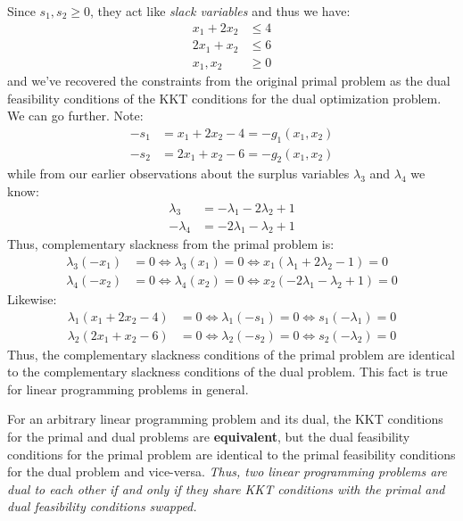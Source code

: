 Since $s_1, s_2 \geq 0$, they act like \textit{slack variables} and thus we have:
\begin{displaymath}
\begin{aligned}
x_1 + 2x_2 &\leq  4\\
2x_1 + x_2 &\leq 6\\
x_1,x_2&\geq 0
\end{aligned}
\end{displaymath}
and we've recovered the constraints from the original primal problem as the dual feasibility conditions of the KKT conditions for the dual optimization problem. We can go further. Note:
\begin{align*}
-s_1 &= x_1 + 2x_2 - 4= -g_1(x_1,x_2)\\
-s_2 &= 2x_1 + x_2 -6 = -g_2(x_1,x_2)
\end{align*}
while from our earlier observations about the surplus variables $\lambda_3$ and $\lambda_4$ we know:
\begin{align*}
\lambda_3 &= -\lambda_1 - 2\lambda_2 + 1\\
-\lambda_4 &= -2\lambda_1 - \lambda_2 + 1
\end{align*}
Thus, complementary slackness from the primal problem is:
\begin{align*}
\lambda_3(-x_1) &= 0 \iff \lambda_3(x_1) =0  \iff 
	x_1(\lambda_1 + 2\lambda_2 - 1) = 0\\
\lambda_4(-x_2) &= 0 \iff \lambda_4(x_2) =0 \iff x_2(-2\lambda_1 - \lambda_2 + 1) = 0
\end{align*}
Likewise:
\begin{align*}
\lambda_1(x_1 + 2x_2 - 4) &=0 \iff \lambda_1(-s_1) = 0 \iff s_1(-\lambda_1) = 0\\
\lambda_2(2x_1 + x_2 - 6) &=0 \iff \lambda_2(-s_2) = 0 \iff s_2(-\lambda_2) = 0
\end{align*}
Thus, the complementary slackness conditions of the primal problem are identical to the complementary slackness conditions of the dual problem. This fact is true for linear programming problems in general.

\begin{remark} For an arbitrary linear programming problem and its dual, the KKT conditions for the primal and dual problems are \textbf{equivalent}, but the dual feasibility conditions for the primal problem are identical to the primal feasibility conditions for the dual problem and vice-versa. \textit{Thus, two linear programming problems are dual to each other if and only if they share KKT conditions with the primal and dual feasibility conditions swapped.}
\end{remark}

